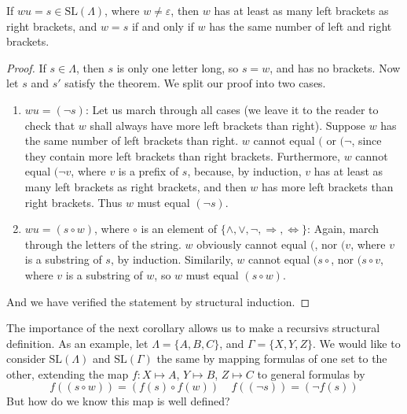 \begin{theorem}
    If $wu = s \in \text{SL}(\Lambda)$, where $w \neq \varepsilon$, then $w$ has at least as many left brackets as right brackets, and $w = s$ if and only if $w$ has the same number of left and right brackets.
\end{theorem}
\begin{proof}
    If $s \in \Lambda$, then $s$ is only one letter long, so $s = w$, and has no brackets. Now let $s$ and $s'$ satisfy the theorem. We split our proof into two cases.
    \begin{enumerate}
        \item $wu = (\neg s)$: Let us march through all cases (we leave it to the reader to check that $w$ shall always have more left brackets than right). Suppose $w$ has the same number of left brackets than right. $w$ cannot equal $($ or $(\neg$, since they contain more left brackets than right brackets. Furthermore, $w$ cannot equal $(\neg v$, where $v$ is a prefix of $s$, because, by induction, $v$ has at least as many left brackets as right brackets, and then $w$ has more left brackets than right brackets. Thus $w$ must equal $(\neg s)$.
        \item $wu = (s \circ w)$, where $\circ$ is an element of $\{ \wedge, \vee, \neg, \Rightarrow, \Leftrightarrow \}$: Again, march through the letters of the string. $w$ obviously cannot equal $($, nor $(v$, where $v$ is a substring of $s$, by induction. Similarily, $w$ cannot equal $(s \circ$, nor $(s \circ v$, where $v$ is a substring of $w$, so $w$ must equal $(s \circ w)$.
    \end{enumerate}
    And we have verified the statement by structural induction.
\end{proof}

The importance of the next corollary allows us to make a recursivs structural definition. As an example, let $\Lambda = \{ A, B, C \}$, and $\Gamma = \{ X, Y, Z \}$. We would like to consider $\text{SL}(\Lambda)$ and $\text{SL}(\Gamma)$ the same by mapping formulas of one set to the other, extending the map $f: X \mapsto A$, $Y \mapsto B$, $Z \mapsto C$ to general formulas by
%
\[ f((s \circ w)) = (f(s) \circ f(w))\ \ \ \ \ f((\neg s)) = (\neg f(s)) \]
%
But how do we know this map is well defined?

